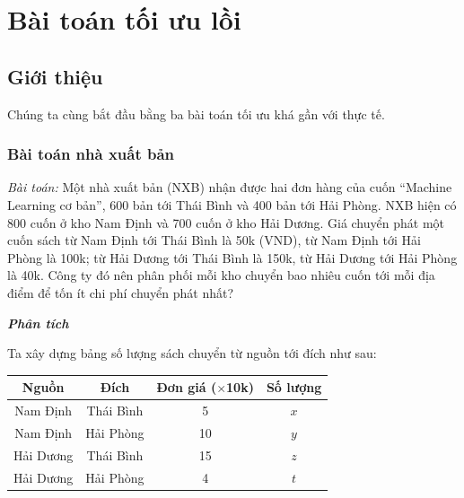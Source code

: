\chapter{Bài toán tối ưu lồi}
\label{cha:cvxopt}
 
\section{Giới thiệu}
Chúng ta cùng bắt đầu bằng ba bài toán tối ưu khá gần với thực tế. 
 
\subsection{Bài toán nhà xuất bản}
 
\textit{Bài toán:}
Một nhà xuất bản (NXB) nhận được hai đơn hàng của cuốn ``Machine Learning cơ bản'', 600 bản tới Thái Bình và 400 bản tới Hải Phòng. NXB hiện có 800 cuốn ở kho Nam Định và 700 cuốn ở kho Hải Dương. Giá chuyển phát một cuốn sách từ Nam Định tới Thái Bình là 50k (VND), từ Nam Định tới Hải Phòng là 100k; từ Hải Dương tới Thái Bình là 150k, từ Hải Dương tới Hải Phòng là 40k. Công ty đó nên phân phối mỗi kho chuyển bao nhiêu cuốn tới mỗi địa điểm để tốn ít chi phí chuyển phát nhất? 
 
 
\textit{\textbf{Phân tích}}

Ta xây dựng bảng số lượng sách chuyển từ nguồn tới đích như sau: 
\begin{table}[h]
\centering
\label{my-label}
\setlength{\tabcolsep}{0.5em}
{\normalsize {}
\begin{tabular}{|c|c|c|c|}
\hline
\textbf{Nguồn} & \textbf{Đích} & \textbf{Đơn giá ($\times$10k)} & \textbf{Số lượng} \\ \hline
Nam Định       & Thái Bình     & 5                       & $x$                 \\ \hline
Nam Định       & Hải Phòng     & 10                      & $y$                 \\ \hline
Hải Dương      & Thái Bình     & 15                      & $z$                 \\ \hline 
Hải Dương      & Hải Phòng     & 4                       & $t$                \\\hline 
\end{tabular}}
\end{table}

